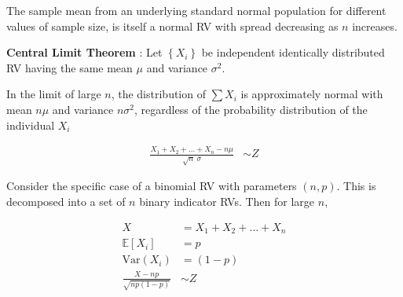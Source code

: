 The sample mean from an underlying standard normal population for different values of sample size, is itself a normal RV with spread decreasing as $ n $ increases.

\begin{figure}[H]
	\centering
\end{figure}

\textbf{Central Limit Theorem} : Let $ \left\{X_i\right\} $ be independent identically distributed RV having the same mean $ \mu $ and variance $ \sigma^2 $.

In the limit of large $ n $, the distribution of $ \sum X_i $ is approximately normal with mean $ n\mu $ and variance $ n\sigma^2 $, regardless of the probability distribution of the individual $ X_i $ 

\begin{align}
	\frac{X_1 + X_2 + \dots + X_n - n\mu}{\sqrt{n}\ \sigma} &\sim Z
\end{align}

Consider the specific case of a binomial RV with parameters $ (n, p) $. This is decomposed into a set of $ n $ binary indicator RVs. Then for large $ n $,

\begin{align}
	X &= X_1 + X_2 + \dots + X_n \nonumber \\
	\mathbb{E}[X_i] &= p \nonumber \\
	\mathrm{Var}(X_i) &= (1-p) \nonumber \\
	\frac{X - np}{\sqrt{np(1-p)}} & \sim Z 
\end{align}


